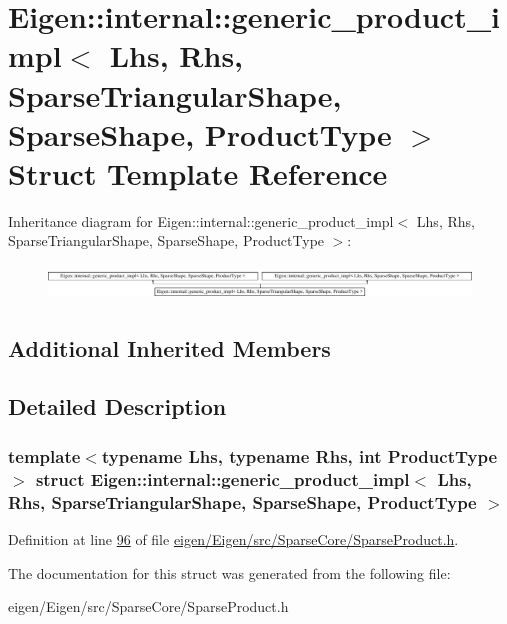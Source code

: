 \hypertarget{struct_eigen_1_1internal_1_1generic__product__impl_3_01_lhs_00_01_rhs_00_01_sparse_triangular_sh3486abfb0e2b8914c411a6ff792a44dd}{}\section{Eigen\+:\+:internal\+:\+:generic\+\_\+product\+\_\+impl$<$ Lhs, Rhs, Sparse\+Triangular\+Shape, Sparse\+Shape, Product\+Type $>$ Struct Template Reference}
\label{struct_eigen_1_1internal_1_1generic__product__impl_3_01_lhs_00_01_rhs_00_01_sparse_triangular_sh3486abfb0e2b8914c411a6ff792a44dd}
Inheritance diagram for Eigen\+:\+:internal\+:\+:generic\+\_\+product\+\_\+impl$<$ Lhs, Rhs, Sparse\+Triangular\+Shape, Sparse\+Shape, Product\+Type $>$\+:\begin{figure}[H]
\begin{center}
\leavevmode
\includegraphics[height=0.916530cm]{struct_eigen_1_1internal_1_1generic__product__impl_3_01_lhs_00_01_rhs_00_01_sparse_triangular_sh3486abfb0e2b8914c411a6ff792a44dd}
\end{center}
\end{figure}
\subsection*{Additional Inherited Members}


\subsection{Detailed Description}
\subsubsection*{template$<$typename Lhs, typename Rhs, int Product\+Type$>$\newline
struct Eigen\+::internal\+::generic\+\_\+product\+\_\+impl$<$ Lhs, Rhs, Sparse\+Triangular\+Shape, Sparse\+Shape, Product\+Type $>$}



Definition at line \hyperlink{eigen_2_eigen_2src_2_sparse_core_2_sparse_product_8h_source_l00096}{96} of file \hyperlink{eigen_2_eigen_2src_2_sparse_core_2_sparse_product_8h_source}{eigen/\+Eigen/src/\+Sparse\+Core/\+Sparse\+Product.\+h}.



The documentation for this struct was generated from the following file\+:\begin{DoxyCompactItemize}
\item 
eigen/\+Eigen/src/\+Sparse\+Core/\+Sparse\+Product.\+h\end{DoxyCompactItemize}

